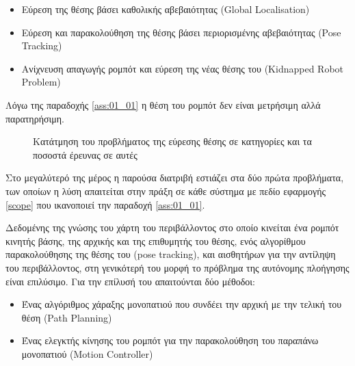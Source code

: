 \begin{itemize}
  \item Εύρεση της θέσης βάσει καθολικής αβεβαιότητας (Global Localisation)
  \item Εύρεση και παρακολούθηση της θέσης βάσει περιορισμένης αβεβαιότητας (Pose Tracking)
  \item Ανίχνευση απαγωγής ρομπότ και εύρεση της νέας θέσης του (Kidnapped Robot Problem)
\end{itemize}

\begin{bw_box}
\begin{remark}
  Λόγω της παραδοχής \ref{ass:01_01} η θέση του ρομπότ δεν είναι μετρήσιμη
  αλλά παρατηρήσιμη.
  \label{remark:observable}
\end{remark}
\end{bw_box}

\begin{figure}\centering
  \vspace{-1cm}
  
  \vspace{-2cm}
  \caption{\small Κατάτμηση του προβλήματος της εύρεσης θέσης σε κατηγορίες και
           τα ποσοστά έρευνας σε αυτές}
  \label{fig:localisation_problems_pie}
\end{figure}

Στο μεγαλύτερό της μέρος η παρούσα διατριβή εστιάζει στα δύο πρώτα προβλήματα,
των οποίων η λύση απαιτείται στην πράξη σε κάθε σύστημα με πεδίο εφαρμογής
\ref{scope} που ικανοποιεί την παραδοχή \ref{ass:01_01}.

Δεδομένης της γνώσης του χάρτη του περιβάλλοντος στο οποίο κινείται ένα ρομπότ
κινητής βάσης, της αρχικής και της επιθυμητής του θέσης, ενός αλγορίθμου
παρακολούθησης της θέσης του (pose tracking), και αισθητήρων για την αντίληψη
του περιβάλλοντος, στη γενικότερή του μορφή το πρόβλημα της αυτόνομης πλοήγησης
είναι επιλύσιμο. Για την επίλυσή του απαιτούνται δύο μέθοδοι:

\begin{itemize}
  \item Ένας αλγόριθμος χάραξης μονοπατιού που συνδέει την αρχική με την τελική
        του θέση (Path Planning)
  \item Ένας ελεγκτής κίνησης του ρομπότ για την παρακολούθηση του παραπάνω
        μονοπατιού (Motion Controller)
\end{itemize}


